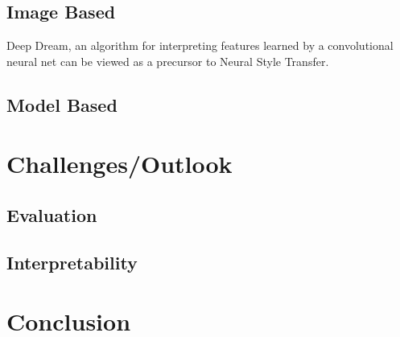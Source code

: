 \documentclass{seminar}
\begin{document}
\subsection{Image Based}
Deep Dream, an algorithm for interpreting features learned by a convolutional neural net can be viewed as a precursor to Neural Style Transfer.





\subsection{Model Based}










\section{Challenges/Outlook}
\subsection{Evaluation}
\subsection{Interpretability}


	
	
	
	
\section{Conclusion}





\newpage






\end{document}
